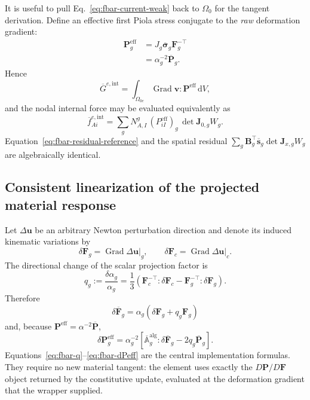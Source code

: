 \documentclass[11pt,a4paper]{article}
\newcommand{\bs}[1]{\boldsymbol{#1}}
\newcommand{\dd}{\mathrm{d}}
\newcommand{\Grad}{\operatorname{Grad}}
\newcommand{\F}{\bs{F}}
\newcommand{\Pstress}{\bs{P}}
\newcommand{\Fb}{\overline{\bs{F}}}
\newcommand{\Pb}{\overline{\bs{P}}}
\newcommand{\Ab}{\overline{\mathbb{A}}^{\mathrm{alg}}}
\newcommand{\sigb}{\overline{\bs{\sigma}}}
\newcommand{\Peff}{\bs{P}^{\mathrm{eff}}}
\newcommand{\vct}[1]{\mathbf{#1}}
\begin{document}
It is useful to pull Eq.~\eqref{eq:fbar-current-weak} back to $\Omega_0$ for the tangent derivation. Define an effective first Piola stress conjugate to the \emph{raw} deformation gradient:
\begin{align}
\Peff_g
&=J_g\sigb_g\F_g^{-\top}\\
&=\boxed{\alpha_g^{-2}\Pb_g}.
\label{eq:fbar-Peff}
\end{align}
Hence
\begin{equation}
\overline G^{e,\mathrm{int}}
=
\int_{\Omega_{0e}}\Grad\bs v:\Peff\,\dd V,
\end{equation}
and the nodal internal force may be evaluated equivalently as
\begin{equation}
\boxed{
\overline f_{Ai}^{e,\mathrm{int}}
=
\sum_g
N_{A,I}^{g}\,
(P_{iI}^{\mathrm{eff}})_g\,
\det\vct J_{0,g}W_g.
}
\label{eq:fbar-residual-reference}
\end{equation}
Equation~\eqref{eq:fbar-residual-reference} and the spatial residual $\sum_g\vct B_g^\top\overline{\vct s}_g\det\vct J_{x,g}W_g$ are algebraically identical.

\subsection{Consistent linearization of the projected material response}
\label{sec:fbar-linearization}

Let $\Delta\bs u$ be an arbitrary Newton perturbation direction and denote its induced kinematic variations by
\begin{equation}
\delta\F_g=\Grad\Delta\bs u\big|_g,
\qquad
\delta\F_c=\Grad\Delta\bs u\big|_c.
\end{equation}
The directional change of the scalar projection factor is
\begin{equation}
\boxed{
q_g
:=\frac{\delta\alpha_g}{\alpha_g}
=
\frac{1}{3}
\left(
\F_c^{-\top}:\delta\F_c
-
\F_g^{-\top}:\delta\F_g
\right).
}
\label{eq:fbar-q}
\end{equation}
Therefore
\begin{equation}
\boxed{
\delta\Fb_g
=
\alpha_g\left(\delta\F_g+q_g\F_g\right)
}
\label{eq:fbar-dFbar}
\end{equation}
and, because $\Peff=\alpha^{-2}\Pb$,
\begin{equation}
\boxed{
\delta\Peff_g
=
\alpha_g^{-2}
\left[
\Ab_g:\delta\Fb_g
-2q_g\Pb_g
\right].
}
\label{eq:fbar-dPeff}
\end{equation}
Equations~\eqref{eq:fbar-q}--\eqref{eq:fbar-dPeff} are the central implementation formulas. They require no new material tangent: the element uses exactly the $D\Pstress/D\F$ object returned by the constitutive update, evaluated at the deformation gradient that the wrapper supplied.
\end{document}
